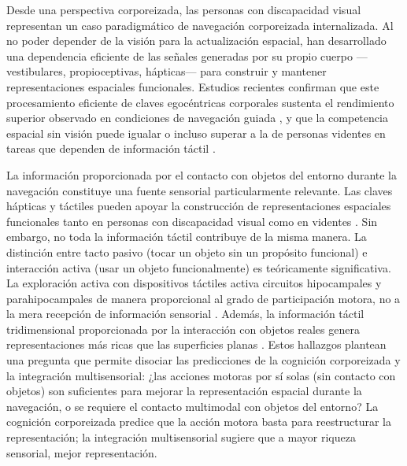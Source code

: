 \documentclass[12pt,letterpaper]{article}
\begin{document}
Desde una perspectiva corporeizada, las personas con discapacidad visual representan un caso paradigmático de navegación corporeizada internalizada. Al no poder depender de la visión para la actualización espacial, han desarrollado una dependencia eficiente de las señales generadas por su propio cuerpo ---vestibulares, propioceptivas, hápticas--- para construir y mantener representaciones espaciales funcionales. Estudios recientes confirman que este procesamiento eficiente de claves egocéntricas corporales sustenta el rendimiento superior observado en condiciones de navegación guiada \parencite{Shafique2024}, y que la competencia espacial sin visión puede igualar o incluso superar a la de personas videntes en tareas que dependen de información táctil \parencite{Szubielska2024}.

La información proporcionada por el contacto con objetos del entorno durante la navegación constituye una fuente sensorial particularmente relevante. Las claves hápticas y táctiles pueden apoyar la construcción de representaciones espaciales funcionales tanto en personas con discapacidad visual como en videntes \parencite{Tivadar2023,Ottink2022map,Bleau2023}. Sin embargo, no toda la información táctil contribuye de la misma manera. La distinción entre tacto pasivo (tocar un objeto sin un propósito funcional) e interacción activa (usar un objeto funcionalmente) es teóricamente significativa. La exploración activa con dispositivos táctiles activa circuitos hipocampales y parahipocampales de manera proporcional al grado de participación motora, no a la mera recepción de información sensorial \parencite{Chebat2020}. Además, la información táctil tridimensional proporcionada por la interacción con objetos reales genera representaciones más ricas que las superficies planas \parencite{Bleau2023}. Estos hallazgos plantean una pregunta que permite disociar las predicciones de la cognición corporeizada y la integración multisensorial: ¿las acciones motoras por sí solas (sin contacto con objetos) son suficientes para mejorar la representación espacial durante la navegación, o se requiere el contacto multimodal con objetos del entorno? La cognición corporeizada predice que la acción motora basta para reestructurar la representación; la integración multisensorial sugiere que a mayor riqueza sensorial, mejor representación.
\end{document}
